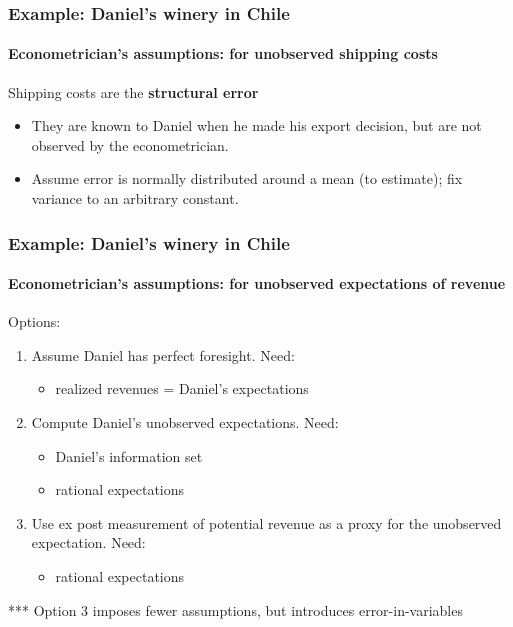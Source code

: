 
\begin{frame}
\frametitle{Example: Daniel's winery in Chile} %
\framesubtitle{Econometrician's assumptions: for unobserved shipping costs}

Shipping costs are the \textbf{structural error}

\begin{itemize}
\item They are known to Daniel when he made his export decision, but are not
observed by the econometrician.

\item Assume error is normally distributed around a mean (to estimate); fix
variance to an arbitrary constant.
\end{itemize}
\end{frame}


\begin{frame}
\frametitle{Example: Daniel's winery in Chile} %
\framesubtitle{Econometrician's assumptions: for unobserved expectations of
revenue}

Options:

\begin{enumerate}
\item Assume Daniel has perfect foresight. Need: 

\begin{itemize}
\item realized revenues = Daniel's expectations 
\end{itemize}

\item Compute Daniel's unobserved expectations. Need: 

\begin{itemize}
\item Daniel's information set 

\item rational expectations 
\end{itemize}

\item Use ex post measurement of potential revenue as a proxy for the
unobserved expectation. Need: 

\begin{itemize}
\item rational expectations 
\end{itemize}
\end{enumerate}

*** Option 3 imposes fewer assumptions, but introduces error-in-variables
\end{frame}


